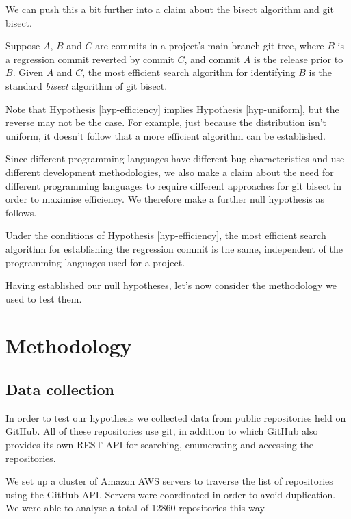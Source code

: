 \documentclass[10pt,journal,compsoc]{IEEEtran}
\begin{document}
We can push this a bit further into a claim about the bisect algorithm and {\code git bisect}.

\begin{hypothesis}
\label{hyp-efficiency}
Suppose $A$, $B$ and $C$ are commits in a project's main branch git tree, where $B$ is a regression commit reverted by commit $C$, and commit $A$ is the release prior to $B$. Given $A$ and $C$, the most efficient search algorithm for identifying $B$ is the standard {\it bisect\/} algorithm of {\code git bisect}.
\end{hypothesis}

Note that Hypothesis \ref{hyp-efficiency} implies Hypothesis \ref{hyp-uniform}, but the reverse may not be the case. For example, just because the distribution isn't uniform, it doesn't follow that a more efficient algorithm can be established.

Since different programming languages have different bug characteristics \cite{nanz2015} and use different development methodologies, we also make a claim about the need for different programming languages to require different approaches for {\code git bisect} in order to maximise efficiency. We therefore make a further null hypothesis as follows.

\begin{hypothesis}
Under the conditions of Hypothesis \ref{hyp-efficiency}, the most efficient search algorithm for establishing the regression commit is the same, independent of the programming languages used for a project.
\end{hypothesis}

Having established our null hypotheses, let's now consider the methodology we used to test them.

\section{Methodology}

\subsection{Data collection}

In order to test our hypothesis we collected data from public repositories held on GitHub. All of these repositories use {\code git}, in addition to which GitHub also provides its own REST API for searching, enumerating and accessing the repositories.

We set up a cluster of Amazon AWS servers to traverse the list of repositories using the GitHub API. Servers were coordinated in order to avoid duplication. We were able to analyse a total of 12860 repositories this way.
\end{document}
